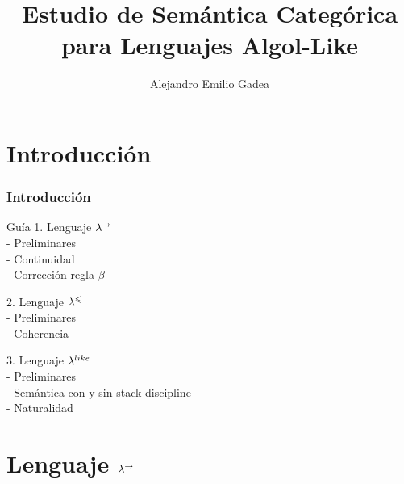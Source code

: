 \documentclass{beamer}
\begin{document}
\beamertemplatenavigationsymbolsempty
\title{Estudio de Semántica Categórica para Lenguajes Algol-Like}
\author{{Alejandro Emilio Gadea}\\
\vspace*{0.5cm}}
\date{}
\frame{\titlepage}

\section{Introducci\'on}

\begin{frame}
\frametitle{Introducci\'on}
\begin{block}{Gu\'ia}
1. Lenguaje $\lambda^{\rightarrow}$\\
\quad \quad - Preliminares \\
\quad \quad - Continuidad \\
\quad \quad - Corrección regla-$\beta$\\

\pause

2. Lenguaje $\lambda^{\leqslant}$\\
\quad \quad - Preliminares \\
\quad \quad - Coherencia \\

\pause

3. Lenguaje $\lambda^{like}$\\
\quad \quad - Preliminares \\
\quad \quad - Semántica con y sin stack discipline \\
\quad \quad - Naturalidad 

\end{block}
\end{frame}

\section{Lenguaje $\lambda^{\rightarrow}$}
\end{document}
